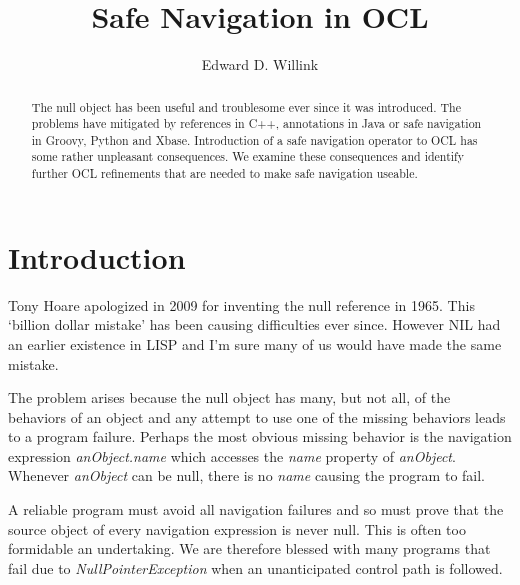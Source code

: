 \documentclass{llncs}
\begin{document}
%
\mainmatter              %
%
\title{Safe Navigation in OCL}
%
%
\author{Edward D. Willink}
%
%
%


\maketitle              %

\begin{abstract}
The null object has been useful and troublesome ever since it was introduced.
The problems have mitigated by references in C++, annotations in Java or safe navigation in Groovy, Python and Xbase.
Introduction of a safe navigation operator to OCL has some rather unpleasant consequences. We examine these
consequences and identify further OCL refinements that are needed to make safe navigation useable.

\end{abstract}
%
\section{Introduction}
%
Tony Hoare apologized in 2009\cite{Hoare-mistake} for inventing the null reference in 1965. This `billion dollar mistake' has been causing difficulties ever since. However NIL had an earlier existence in LISP and I'm sure many of us would have made the same mistake.

The problem arises because the null object has many, but not all, of the behaviors of an object and any attempt to use one of the missing behaviors leads to a program failure. Perhaps the most obvious missing behavior is the navigation expression \emph{anObject.name} which accesses the \emph{name} property of \emph{anObject}. Whenever \emph{anObject} can be null, there is no \emph{name} causing the program to fail.

A reliable program must avoid all navigation failures and so must prove that the source object of every navigation expression is never null. This is often too formidable an undertaking. We are therefore blessed with many programs that fail due to \emph{NullPointerException} when an unanticipated control path is followed.
\end{document}
